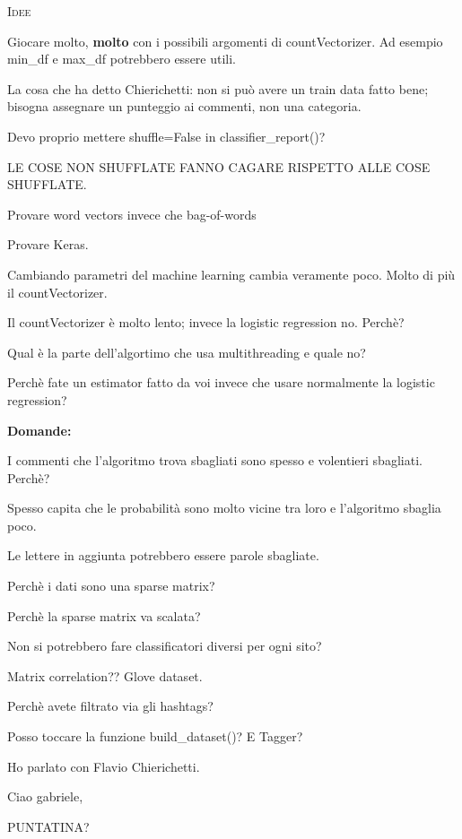 \documentclass[a4paper,10pt]{article} %
\newcommand{\msection}[1]{%
    {\newpage\bigbreak \bigbreak \par \hfil \huge \textsc {#1}}\par}
\renewcommand{\b}[1]{%
    {\textbf{#1}}}
\begin{document}
\msection{Idee }

Giocare molto, \b{molto} con i possibili argomenti di countVectorizer. Ad esempio min\_df e max\_df potrebbero essere utili.

La cosa che ha detto Chierichetti: non si può avere un train data fatto bene; bisogna assegnare un punteggio ai commenti, non una categoria.

Devo proprio mettere shuffle=False in classifier\_report()?

LE COSE NON SHUFFLATE FANNO CAGARE RISPETTO ALLE COSE SHUFFLATE.

Provare word vectors invece che bag-of-words

Provare Keras.

\bigbreak

Cambiando parametri del machine learning cambia veramente poco. Molto di più il countVectorizer.

Il countVectorizer è molto lento; invece la logistic regression no. Perchè?

Qual è la parte dell'algortimo che usa multithreading e quale no?

Perchè fate un estimator fatto da voi invece che usare normalmente la logistic regression?

\b{Domande:}


I commenti che l'algoritmo trova sbagliati sono spesso e volentieri sbagliati. Perchè?

Spesso capita che le probabilità sono molto vicine tra loro e l'algoritmo sbaglia poco.

Le lettere in aggiunta potrebbero essere parole sbagliate.

Perchè i dati sono una sparse matrix?

Perchè la sparse matrix va scalata?

Non si potrebbero fare classificatori diversi per ogni sito?

Matrix correlation?? Glove dataset. 

Perchè avete filtrato via gli hashtags?

Posso toccare la funzione build\_dataset()? E Tagger?

Ho parlato con Flavio Chierichetti.

Ciao gabriele, 


\Huge PUNTATINA?
\end{document}
